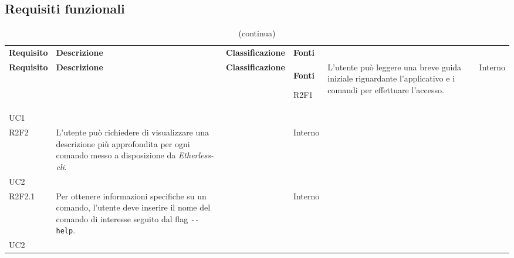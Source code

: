 \subsection{Requisiti funzionali}

\def\arraystretch{1.75}
\begin{longtable}{ 
		>{\centering}p{} 
		>{}p{} 
		>{\centering}p{}
		>{\centering}p{} }
	
	\caption{Tabella dei requisiti funzionali} \\
	\coloredTableHead
	\textbf{\color{white}Requisito} & 
	\centering\textbf{\color{white}Descrizione} & 
	\centering\textbf{\color{white}Classificazione} &
	\textbf{\color{white}Fonti} 
	\endfirsthead
	
	\caption[]{(continua)}\\
	\textbf{\color{white}Requisito} &
	\centering\textbf{\color{white}Descrizione} &
	\centering\textbf{\color{white}Classificazione} &
	\textbf{\color{white}Fonti} 
	\endhead

	R2F1 & L'utente può leggere una breve guida iniziale riguardante l'applicativo
			e i comandi per effettuare l'accesso. 									& \de & Interno \\ UC1 \tabularnewline

	R2F2 & L'utente può richiedere di visualizzare una descrizione più approfondita
		 per ogni comando messo a disposizione da \textit{Etherless-cli}.			& \de & Interno \\ UC2 \tabularnewline
	R2F2.1 & Per ottenere informazioni specifiche su un comando, l'utente deve
		inserire il nome del comando di interesse seguito dal flag \texttt{-{}-help}.	& \de & Interno \\ UC2 \tabularnewline


\end{longtable}
